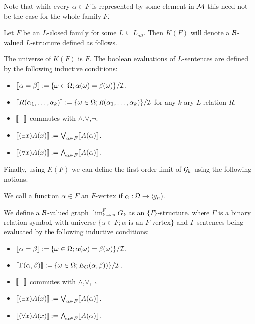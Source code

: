 Note that while every $\alpha\in F$ is represented by some element in $\mathcal{M}$ this need not be the case for the whole family $F$.

\begin{defi}
Let $F$ be an $L$-closed family for some $L\subseteq L_{all}$. Then $K(F)$ will denote a $\mathcal{B}$-valued $L$-structure defined as follows.

The universe of $K(F)$ is $F$. The boolean evaluations of $L$-sentences are defined by the following inductive conditions:

\begin{itemize}
\item $\llbracket \alpha=\beta \rrbracket := \{\omega\in\Omega; \alpha(\omega)=\beta(\omega)\}/\mathcal{I}.$
\item $\llbracket R(\alpha_1,\dots,\alpha_k) \rrbracket := \{\omega\in\Omega; R(\alpha_1,\dots,\alpha_k)\}/\mathcal{I}$ for any $k$-ary $L$-relation $R$.
\item $\llbracket-\rrbracket$ commutes with $\land$,$\lor$,$\lnot$.
\item $\llbracket(\exists x)A(x)\rrbracket:=\bigvee_{\alpha\in F}\llbracket A(\alpha)\rrbracket$.
\item $\llbracket(\forall x)A(x)\rrbracket:=\bigwedge_{\alpha\in F}\llbracket A(\alpha)\rrbracket$.
\end{itemize}
\end{defi}

Finally, using $K(F)$ we can define the first order limit of $\mathcal{G}_k$ using the following notions.

\begin{defi}
We call a function $\alpha\in F$ an $F$-vertex if ${\alpha:\Omega\to\langle g_n)}.$

We define a $\mathcal{B}$-valued graph $\lim_{k\to n}^{F}G_k$ as an $\{\Gamma\}$-structure, where $\Gamma$ is a binary relation symbol, with universe $\{\alpha\in F; \alpha\text{ is an $F$-vertex}\}$ and $\Gamma$-sentences being evaluated by the following inductive conditions:
\begin{itemize}
\item $\llbracket \alpha=\beta \rrbracket := \{\omega\in\Omega; \alpha(\omega)=\beta(\omega)\}/\mathcal{I}.$
\item $\llbracket \Gamma(\alpha,\beta) \rrbracket := \{\omega\in\Omega; E_G(\alpha,\beta))\}/\mathcal{I}$.
\item $\llbracket-\rrbracket$ commutes with $\land$,$\lor$,$\lnot$.
\item $\llbracket(\exists x)A(x)\rrbracket:=\bigvee_{\alpha\in F}\llbracket A(\alpha)\rrbracket$.
\item $\llbracket(\forall x)A(x)\rrbracket:=\bigwedge_{\alpha\in F}\llbracket A(\alpha)\rrbracket$.
\end{itemize}
\end{defi}

